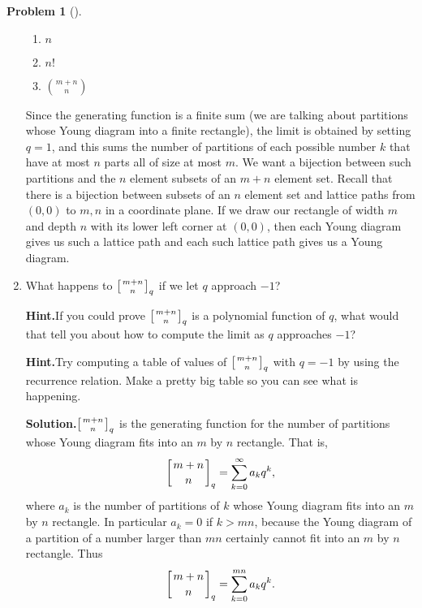 \documentclass[10pt,]{book}
\theoremstyle{plain}
\theoremstyle{definition}
\newtheorem{activity}[project]{Problem}
\theoremstyle{definition}
\numberwithin{equation}{chapter}
\newcommand{\qchoose}[2]{\left[{#1\atop#2}\right]_q}
\begin{document}
\begin{activity}[]
\begin{enumerate}[font=\bfseries,label=(\alph*),ref=\alph*]
\begin{enumerate}[label=(\roman*)]
\item\hypertarget{li-77}{}\(n\)%
\item\hypertarget{li-78}{}\(n!\)%
\item\hypertarget{li-79}{}\(\binom{m+n}{n}\)%
\end{enumerate}
 Since the generating function is a finite sum (we are talking about partitions whose Young diagram into a finite rectangle), the limit is obtained by setting \(q=1\), and this sums the number of partitions of each possible number \(k\) that have at most \(n\) parts all of size at most \(m\). We want a bijection between such partitions and the \(n\) element subsets of an \(m+n\) element set. Recall that there is a bijection between subsets of an \(n\) element set and lattice paths from \((0,0)\) to \(m,n\) in a coordinate plane. If we draw our rectangle of width \(m\) and depth \(n\) with its lower left corner at \((0,0)\), then each Young diagram gives us such a lattice path and each such lattice path gives us a Young diagram.%
\item\label{task-152} What happens to \(\qchoose{m+n}{n}\) if we let \(q\) approach \(-1\)?%
\par\medskip\noindent%
\textbf{Hint.}\quad If you could prove \(\qchoose{m+n}{n}\) is a polynomial function of \(q\), what would that tell you about how to compute the limit as \(q\) approaches \(-1\)?%
\par\medskip\noindent%
\textbf{Hint.}\quad Try computing a table of values of \(\qchoose{m+n}{n}\) with \(q=-1\) by using the recurrence relation. Make a pretty big table so you can see what is happening.%
\par\medskip\noindent%
\textbf{Solution.}\quad \(\qchoose{m+n}{n}\) is the generating function for the number of partitions whose Young diagram fits into an \(m\) by \(n\) rectangle. That is,%
\begin{equation*}
\qchoose{m+n}{n}=\sum_{k=0}^\infty a_kq^k,
\end{equation*}
where \(a_k\) is the number of partitions of \(k\) whose Young diagram fits into an \(m\) by \(n\) rectangle. In particular \(a_k=0\) if \(k>mn\), because the Young diagram of a partition of a number larger than \(mn\) certainly cannot fit into an \(m\) by \(n\) rectangle. Thus%
\begin{equation*}
\qchoose{m+n}{n}=\sum_{k=0}^{mn} a_kq^k.
\end{equation*}
%
\par

\end{enumerate}
\end{activity}
\end{document}
